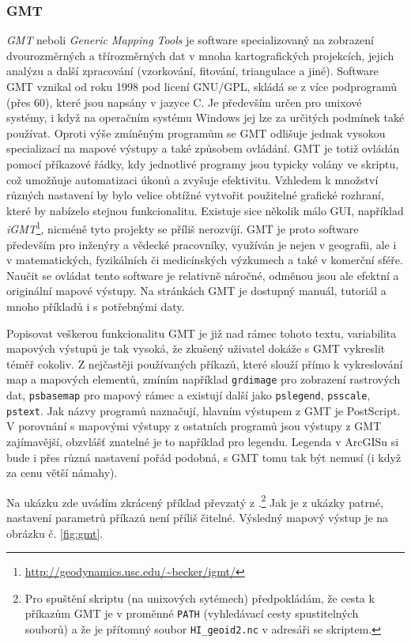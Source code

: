 \documentclass[a4paper,12pt,draft]{article}
\begin{document}
\subsubsection{GMT}
\label{sec:porovnani:gmt}
\emph{GMT} neboli \emph{Generic Mapping Tools} \cite{GMT} je software
specializovaný na zobrazení dvourozměrných a třírozměrných dat v mnoha
kartografických projekcích, jejich
analýzu a další zpracování (vzorkování, fitování, triangulace a jiné). Software
GMT vznikal od roku 1998 pod licení GNU/GPL, skládá se z více podprogramů (přes
60), které jsou napsány v jazyce C. Je především určen pro unixové systémy, i
když na operačním systému Windows jej lze za určitých podmínek také používat. 
Oproti výše zmíněným programům se GMT odlišuje jednak vysokou specializací na
mapové výstupy a také způsobem ovládání. GMT je totiž ovládán pomocí příkazové
řádky, kdy jednotlivé programy jsou typicky volány ve skriptu, což umožňuje
automatizaci úkonů a zvyšuje efektivitu. Vzhledem k množství různých nastavení
by bylo velice obtížné vytvořit použitelné grafické rozhraní, které by nabízelo
stejnou funkcionalitu. Existuje sice několik málo GUI, například
\emph{iGMT}\footnote{\url{http://geodynamics.usc.edu/~becker/igmt/}}, nicméně
tyto projekty se příliš nerozvíjí. GMT je proto software především pro
inženýry a vědecké pracovníky, využíván je nejen v geografii, ale i v
matematických, fyzikálních či medicínských výzkumech a také v komerční sféře.
Naučit se ovládat tento software je relativně náročné, odměnou jsou ale
efektní a originální mapové výstupy. Na stránkách GMT \cite{GMT} je dostupný
manuál, tutoriál a mnoho příkladů i s potřebnými daty.

Popisovat veškerou funkcionalitu GMT je již nad rámec tohoto textu, variabilita
mapových výstupů je tak vysoká, že zkušený uživatel dokáže s GMT vykreslit
téměř cokoliv. Z nejčastěji používaných příkazů, které slouží přímo k
vykreslování map a mapových elementů, zmíním například \verb|grdimage| pro
zobrazení rastrových dat, \verb|psbasemap| pro mapový rámec a existují další
jako \verb|pslegend|, \verb|psscale|, \verb|pstext|. Jak názvy programů
naznačují, hlavním výstupem z GMT je PostScript.
V porovnání s mapovými výstupy z ostatních programů jsou výstupy z GMT
zajímavější, obzvlášť znatelné je to například pro legendu. Legenda v ArcGISu si
bude i přes různá nastavení pořád podobná, s GMT tomu tak být nemusí (i když za
cenu větší námahy).

Na ukázku zde uvádím zkrácený příklad převzatý z \cite[příklad č.
2]{GMT}.\footnote{Pro spuštění skriptu (na unixových sytémech) předpokládám, že
cesta k příkazům GMT je v proměnné \texttt{PATH} (vyhledávací cesty
spustitelných souborů) a že je přítomný soubor \texttt{HI\_geoid2.nc}
v adresáři se skriptem.} Jak je z ukázky patrné, nastavení parametrů příkazů
není příliš čitelné. Výsledný mapový výstup je na obrázku č. \ref{fig:gmt}. 
 
\end{document}
